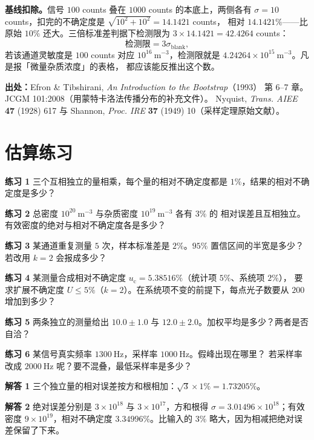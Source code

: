 \textbf{基线扣除。}信号 $100$ counts 叠在 $1000$ counts 的本底上，两侧各有
$\sigma=10$ counts，扣完的不确定度是 $\sqrt{10^2+10^2}=14.1421$ counts，
相对 $14.1421\%$——比原始 $10\%$ 还大。三倍标准差判据下检测限为
$3\times14.1421=42.4264$ counts：
\begin{equation}
\text{检测限}=3\sigma_\mathrm{blank},
\label{eq:app-au-lod}
\end{equation}
若该通道灵敏度是 $100$ counts 对应 $10^{16}\ \mathrm{m^{-3}}$，检测限就是
$4.24264\times10^{15}\ \mathrm{m^{-3}}$。凡是报「微量杂质浓度」的表格，
都应该能反推出这个数。

{\small

\textbf{出处：}Efron \& Tibshirani, \emph{An Introduction to the Bootstrap}（1993）
第 6--7 章。
JCGM 101:2008（用蒙特卡洛法传播分布的补充文件）。
Nyquist, \emph{Trans. AIEE} \textbf{47} (1928) 617 与 Shannon, \emph{Proc. IRE}
\textbf{37} (1949) 10（采样定理原始文献）。
}

\section{估算练习}
\label{sec:app-au-problems}

\textbf{练习 1}
三个互相独立的量相乘，每个量的相对不确定度都是 $1\%$，结果的相对不确定度是多少？

\textbf{练习 2}
总密度 $10^{20}\ \mathrm{m^{-3}}$ 与杂质密度 $10^{19}\ \mathrm{m^{-3}}$ 各有 $3\%$ 的
相对误差且互相独立。有效密度的绝对与相对不确定度各是多少？

\textbf{练习 3}
某通道重复测量 $5$ 次，样本标准差是 $2\%$。$95\%$ 置信区间的半宽是多少？
若改用 $k=2$ 会报成多少？

\textbf{练习 4}
某测量合成相对不确定度 $u_\mathrm{c}=5.38516\%$（统计项 $5\%$、系统项 $2\%$），
要求扩展不确定度 $U\le5\%$（$k=2$）。在系统项不变的前提下，每点光子数要从 $200$
增加到多少？

\textbf{练习 5}
两条独立的测量给出 $10.0\pm1.0$ 与 $12.0\pm2.0$。加权平均是多少？两者是否自洽？

\textbf{练习 6}
某信号真实频率 $1300\ \mathrm{Hz}$，采样率 $1000\ \mathrm{Hz}$。假峰出现在哪里？
若采样率改成 $2000\ \mathrm{Hz}$ 呢？要不混叠，最低采样率是多少？

\textbf{解答 1}
三个独立量的相对误差按方和根相加：$\sqrt{3}\times1\%=1.73205\%$。

\textbf{解答 2}
绝对误差分别是 $3\times10^{18}$ 与 $3\times10^{17}$，方和根得
$\sigma=3.01496\times10^{18}$；有效密度 $9\times10^{19}$，相对不确定度
$3.34996\%$。比输入的 $3\%$ 略大，因为相减把绝对误差保留了下来。

